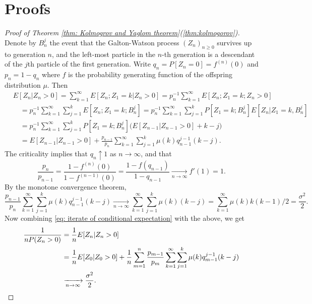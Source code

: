 \documentclass[ECP]{ejpecp} %
\begin{document}
\section{Proofs}
\label{sec: proofs}
\begin{proof}[Proof of Theorem \ref{thm: Kolmogrov and Yaglom theorem}(\ref{thm:kolmogorov})]
	Denote by $B_n^j$ the event that the Galton-Watson process
	$(Z_n)_{n\geq 0}$
	survives up to generation $n$, and the left-most particle in the $n$-th generation is
	a descendant of the $j$th particle of the first generation.
	Write $q_n = P[Z_n = 0] = f^{(n)}(0)$ and $p_n = 1- q_n$ where $f$ is the probability generating function of the offspring distribution $\mu$.
	Then
	\begin{equation}
	\label{eq: iterate of conditional expectation}
	\begin{split}
	&E[Z_n| Z_n>0]
	= \sum_{k=1}^\infty E[Z_n; Z_1=k| Z_n>0]
	= p_n^{-1} \sum_{k=1}^\infty E[Z_n; Z_1=k;Z_{n}>0]
	\\&\quad = p_n^{-1} \sum_{k=1}^\infty \sum_{j=1}^k E[Z_n; Z_1=k;B_n^j]
	= p_n^{-1} \sum_{k=1}^\infty \sum_{j=1}^k P[Z_1=k;B_n^j] E[Z_n| Z_1=k,B_n^j]
	\\&\quad = p_n^{-1} \sum_{k=1}^\infty \sum_{j=1}^k P[Z_1=k;B_n^j] \Big( E[Z_{n-1}| Z_{n-1}>0] +k-j\Big)
	\\&\quad = E[Z_{n-1}|Z_{n-1}> 0]  + \frac{p_{n-1}}{p_n}\sum_{k=1}^\infty \sum_{j=1}^k \mu(k) q_{n-1}^{j-1}(k-j).
	\end{split}
	\end{equation}
	The criticality implies that $q_n \uparrow 1$ as $n \to \infty$, and that
	\[
	\frac{p_n}{p_{n-1}} = \frac{1- f^{(n)}(0)}{1-f^{(n-1)}(0)} = \frac{1- f(q_{n-1})}{1-q_{n-1}} \xrightarrow[n \to \infty]{} f'(1) = 1.
	\]
	By the monotone convergence theorem,
	\[
	\frac{p_{n-1}}{p_n} \sum_{k=1}^\infty \sum_{j=1}^k \mu(k) q_{n-1}^{j-1} (k-j)
	\xrightarrow[n \to \infty]{} \sum_{k=1}^\infty \sum_{j=1}^k \mu(k) (k-j)
	=  \sum_{k=1}^\infty \mu(k) k(k-1)/2
	= \frac{\sigma^2}{2}.
	\]
	Now combining \eqref{eq: iterate of conditional expectation} with the above, we get
	\[\begin{split}
	\frac{1}{n P(Z_n > 0)}
	&= \frac{1}{n} E[Z_n | Z_n > 0]
	\\&= \frac{1}{n}E[Z_0| Z_0 > 0] + \frac{1}{n} \sum_{m = 1}^n \frac{p_{m-1}}{p_m}\sum_{k=1}^\infty \sum_{j=1}^k \mu(k) q_{m-1}^{j-1}(k-j)
	\\& \xrightarrow[n \to \infty]{} \frac{\sigma^2}{2}.
	\qedhere
	\end{split}\]
\end{proof}
\end{document}

